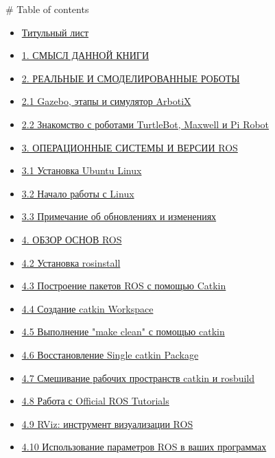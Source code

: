 # Table of contents


\begin{itemize} 
\item { \href{README.md}{Титульный лист}} 
\item { \href{1.-smysl-dannoi-knigi.md}{1. СМЫСЛ ДАННОЙ КНИГИ}} 
\item { \href{2.-realnye-i-smodelirovannye-roboty.md}{2. РЕАЛЬНЫЕ И СМОДЕЛИРОВАННЫЕ РОБОТЫ}} 
\item { \href{2.1-gazebo-etapy-i-simulyator-arbotix.md}{2.1 Gazebo, этапы и симулятор ArbotiX}} 
\item { \href{2.2-znakomstvo-s-robotami-turtlebot-maxwell-i-pi-robot.md}{2.2 Знакомство с роботами TurtleBot, Maxwell и Pi Robot}} 
\item { \href{3.-operacionnye-sistemy-i-versii-ros.md}{3. ОПЕРАЦИОННЫЕ СИСТЕМЫ И ВЕРСИИ ROS}} 
\item { \href{3.1-ustanovka-ubuntu-linux.md}{3.1 Установка Ubuntu Linux}} 
\item { \href{3.2-nachalo-raboty-s-linux.md}{3.2 Начало работы с Linux}} 
\item { \href{3.3-primechanie-ob-obnovleniyakh-i-izmeneniyakh.md}{3.3 Примечание об обновлениях и изменениях}} 
\item { \href{4.1-ustanovka-ros.md}{4. ОБЗОР ОСНОВ ROS}} 
\item { \href{4.2-ustanovka-rosinstall.md}{4.2 Установка rosinstall}} 
\item { \href{4.3-postroenie-paketov-ros-s-pomoshyu-catkin.md}{4.3 Построение пакетов ROS с помощью Catkin}} 
\item { \href{4.4-sozdanie-catkin-workspace.md}{4.4 Создание catkin Workspace}} 
\item { \href{4.5-vypolnenie-make-clean-s-pomoshyu-catkin.md}{4.5 Выполнение "make clean" с помощью catkin}} 
\item { \href{4.6-vosstanovlenie-single-catkin-package.md}{4.6 Восстановление Single catkin Package}} 
\item { \href{4.7-smeshivanie-rabochikh-prostranstv-catkin-i-rosbuild.md}{4.7 Смешивание рабочих пространств catkin и rosbuild}} 
\item { \href{4.8-rabota-s-official-ros-tutorials.md}{4.8 Работа с Official ROS Tutorials}} 
\item { \href{4.9-rviz-instrument-vizualizacii-ros.md}{4.9 RViz: инструмент визуализации ROS}} 
\item { \href{4.10-ispolzovanie-parametrov-ros-v-vashikh-programmakh.md}{4.10 Использование параметров ROS в ваших программах}} 

\end{itemize}
